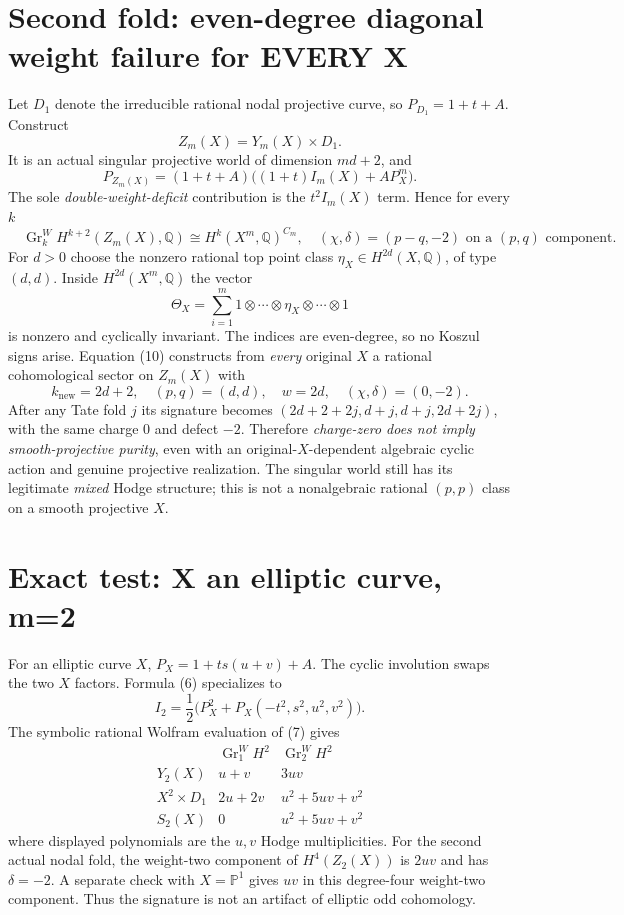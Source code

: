 \documentclass[11pt]{article}
\begin{document}
\section{Second fold: even-degree diagonal weight failure for EVERY X}
Let $D_1$ denote the irreducible rational nodal projective curve,
so $P_{D_1}=1+t+A$. Construct
\[
             Z_m(X)=Y_m(X)\times D_1.
\]
It is an actual singular projective world of dimension $md+2$,
and
\[
 \boxed{\qquad
 P_{Z_m(X)}=(1+t+A)
             \bigl((1+t)I_m(X)+A P_X^m\bigr).
 \qquad}                                               \tag{9}
\]
The sole \emph{double-weight-deficit} contribution is the
$t^2 I_m(X)$ term. Hence for every $k$
\[
 \boxed{\quad
 \operatorname{Gr}^W_{k}H^{k+2}(Z_m(X),\mathbb Q)
 \cong H^k(X^m,\mathbb Q)^{C_m},
 \quad(\chi,\delta)=(p-q,-2)\text{ on a }(p,q)\text{ component}.
 \quad}                                                \tag{10}
\]
For $d>0$ choose the nonzero rational top point class
$\eta_X\in H^{2d}(X,\mathbb Q)$, of type $(d,d)$.
Inside $H^{2d}(X^m,\mathbb Q)$ the vector
\[
       \Theta_X=\sum_{i=1}^m
       1\otimes\cdots\otimes\eta_X\otimes\cdots\otimes1
                                                               \tag{11}
\]
is nonzero and cyclically invariant. The indices are
even-degree, so no Koszul signs arise.
Equation (10) constructs from \emph{every} original $X$
a rational cohomological sector on $Z_m(X)$ with
\[
       k_{\mathrm{new}}=2d+2,\quad
       (p,q)=(d,d),\quad
       w=2d,\quad
       (\chi,\delta)=(0,-2).
                                                               \tag{12}
\]
After any Tate fold $j$ its signature becomes
$(2d+2+2j,d+j,d+j,2d+2j)$, with the same charge $0$
and defect $-2$. Therefore \emph{charge-zero does not imply
smooth-projective purity}, even with an original-$X$-dependent
algebraic cyclic action and genuine projective realization.
The singular world still has its legitimate \emph{mixed}
Hodge structure; this is not a nonalgebraic rational $(p,p)$
class on a smooth projective $X$.

\section{Exact test: X an elliptic curve, m=2}
For an elliptic curve $X$, $P_X=1+ts(u+v)+A$.
The cyclic involution swaps the two $X$ factors. Formula (6)
specializes to
\[
 I_2=\frac12\bigl(P_X^2+
       P_X(-t^2,s^2,u^2,v^2)\bigr).
\]
The symbolic rational Wolfram evaluation of (7) gives
\[
 \begin{array}{c|c|c}
  &\operatorname{Gr}^W_1 H^2&
        \operatorname{Gr}^W_2 H^2\\ \hline
 Y_2(X)&u+v&3uv\\
 X^2\times D_1&2u+2v&u^2+5uv+v^2\\
 S_2(X)&0&u^2+5uv+v^2
 \end{array}
\]
where displayed polynomials are the $u,v$ Hodge multiplicities.
For the second actual nodal fold, the weight-two component of
$H^4(Z_2(X))$ is $2uv$ and has $\delta=-2$.
A separate check with $X=\mathbb P^1$ gives $uv$ in this
degree-four weight-two component. Thus the signature
is not an artifact of elliptic odd cohomology.
\end{document}
